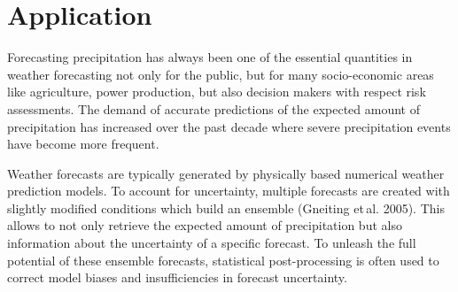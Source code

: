 \documentclass[twoside]{report}
\begin{document}
{    %

}


\maketitle



\section{Application}

Forecasting precipitation has always been one of the essential quantities in
weather forecasting not only for the public, but for many socio-economic areas
like agriculture, power production, but also decision makers with respect risk
assessments. 
The demand of accurate predictions of the expected amount of precipitation has
increased over the past decade where severe precipitation events have
become more frequent.

Weather forecasts are typically generated by physically based numerical weather
prediction models. To account for uncertainty, multiple forecasts are created
with slightly modified conditions which build an ensemble (Gneiting et\,al.
2005). This allows to not only retrieve the expected amount of precipitation
but also information about the uncertainty of a specific forecast.
To unleash the full potential of these ensemble forecasts, statistical
post-processing is often used to correct model biases and insufficiencies in
forecast uncertainty.
\end{document}
